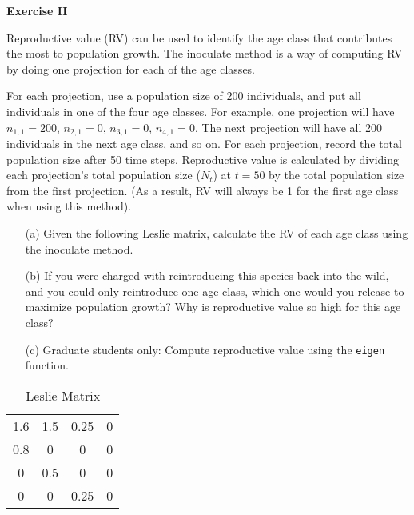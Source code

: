 \documentclass[12pt]{article}\usepackage[]{graphicx}\usepackage[]{xcolor}
\begin{document}
\vspace{12pt}

\clearpage

{\bf Exercise II \\}

Reproductive value (RV) can be used to identify the age class that
contributes the most to population growth. The inoculate method is a
way of computing RV by doing one projection for each of the age
classes.

For each projection, use a population size of 200 individuals, and put
all individuals in one of the four age classes. For example, one
projection will have $n_{1,1}=200$, $n_{2,1}=0$, $n_{3,1}=0$, $n_{4,1}=0$. The next
projection will have all 200 individuals in the next age class, and so
on. For each projection, record the total population size after 50
time steps. Reproductive value is calculated by dividing each
projection's total population size ($N_t$) at $t=50$ by the total population
size from the first projection. (As a result, RV will always be 1 for
the first age class when using this method).

\begin{itemize}
  \item[(a)] Given the following Leslie matrix, calculate the RV of each
    age class using the inoculate method.
  \item[(b)] If you were charged with reintroducing this species back
    into the wild, and you could only reintroduce one age class, which
    one would you release to maximize population growth? Why is
    reproductive value so high for this age class?
  \item[(c)] Graduate students only: Compute reproductive value using
    the \texttt{eigen} function.
\end{itemize}

\begin{table}[h]
  \centering
  \caption{Leslie Matrix}
  \begin{tabular}{cccc}
    \hline
    1.6 & 1.5 & 0.25 & 0 \\
    0.8 & 0   & 0    & 0 \\
    0   & 0.5 & 0    & 0 \\
    0   & 0   & 0.25 & 0 \\
    \hline
  \end{tabular}
  \label{tab:A}
\end{table}
\end{document}
